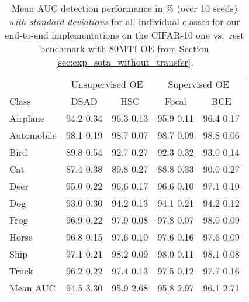 \documentclass[10pt]{article} \usepackage[accepted]{stylefiles/tmlr}
\begin{document}
\begin{table*}[th]
    \caption{Mean AUC detection performance in \% (over 10 seeds) \emph{with standard deviations} for all individual classes for our end-to-end implementations on the CIFAR-10 one vs.~rest benchmark with 80MTI OE from Section \ref{sec:exp_sota_without_transfer}. }
    \label{tab:cifar10_classes_}
    \vspace{0.5em}
    \centering\small
    \begin{tabular}{lcccc}
    \toprule
                & \multicolumn{2}{c|}{Unsupervised OE} & \multicolumn{2}{c}{Supervised OE}\\
    Class       & DSAD & \multicolumn{1}{c|}{HSC} & Focal & BCE \\
    \midrule
    Airplane    & 94.2  0.34 & 96.3  0.13 & 95.9  0.11 & 96.4  0.17\\
    Automobile  & 98.1  0.19 & 98.7  0.07 & 98.7  0.09 & 98.8  0.06\\
    Bird        & 89.8  0.54 & 92.7  0.27 & 92.3  0.32 & 93.0  0.14\\
    Cat         & 87.4  0.38 & 89.8  0.27 & 88.8  0.33 & 90.0  0.27\\
    Deer        & 95.0  0.22 & 96.6  0.17 & 96.6  0.10 & 97.1  0.10\\
    Dog         & 93.0  0.30 & 94.2  0.13 & 94.1  0.21 & 94.2  0.12\\
    Frog        & 96.9  0.22 & 97.9  0.08 & 97.8  0.07 & 98.0  0.09\\
    Horse       & 96.8  0.15 & 97.6  0.10 & 97.6  0.16 & 97.6  0.09\\
    Ship        & 97.1  0.21 & 98.2  0.09 & 98.0  0.11 & 98.1  0.08\\
    Truck       & 96.2  0.22 & 97.4  0.13 & 97.5  0.12 & 97.7  0.16\\
    \midrule
    Mean AUC    & 94.5  3.30 & 95.9  2.68 & 95.8  2.97 & 96.1  2.71\\
    \bottomrule
\end{tabular} \end{table*}
\end{document}
